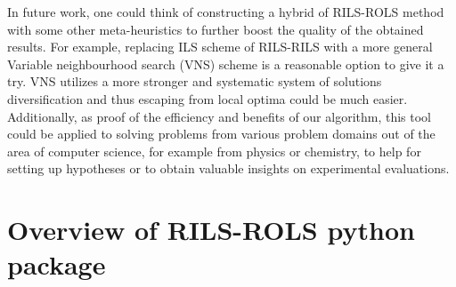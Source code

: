 \documentclass[a4paper,12pt]{elsarticle}
\begin{document}
In future work, one could think of constructing a hybrid of \textsc{RILS-ROLS} method with some other meta-heuristics to further boost the quality of the obtained results. For example, replacing ILS scheme of \textsc{RILS-RILS} with a more general Variable neighbourhood search (VNS) scheme is a reasonable option to give it a try. VNS   utilizes a more stronger and systematic system of solutions diversification and thus escaping from local optima could be much easier.  Additionally, as proof of the efficiency and benefits of our algorithm, this tool could be applied to solving problems from various problem domains out of the area of computer science, for example from physics or chemistry, to help for setting up hypotheses or to obtain valuable insights on experimental evaluations.  

\newpage
\appendix

\section{Overview of \textsc{RILS}-\textsc{ROLS}  python package}\label{sec:appendix-1}




%		


\newpage
	
	
\end{document}
